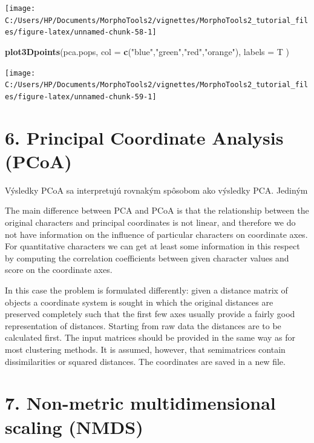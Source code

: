 \documentclass[
]{article}
\newenvironment{Shaded}{\begin{snugshade}}{\end{snugshade}}
\newcommand{\DataTypeTok}[1]{\textcolor[rgb]{0.13,0.29,0.53}{#1}}
\newcommand{\KeywordTok}[1]{\textcolor[rgb]{0.13,0.29,0.53}{\textbf{#1}}}
\newcommand{\NormalTok}[1]{#1}
\newcommand{\StringTok}[1]{\textcolor[rgb]{0.31,0.60,0.02}{#1}}
\begin{document}
\begin{center}\texttt{[image: C:/Users/HP/Documents/MorphoTools2/vignettes/MorphoTools2\_tutorial\_files/figure-latex/unnamed-chunk-58-1]} \end{center}

\begin{Shaded}
\begin{Highlighting}[]
\KeywordTok{plot3Dpoints}\NormalTok{(pca.pops, }\DataTypeTok{col =} \KeywordTok{c}\NormalTok{(}\StringTok{"blue"}\NormalTok{,}\StringTok{"green"}\NormalTok{,}\StringTok{"red"}\NormalTok{,}\StringTok{"orange"}\NormalTok{), }\DataTypeTok{labels =}\NormalTok{ T )}
\end{Highlighting}
\end{Shaded}

\begin{center}\texttt{[image: C:/Users/HP/Documents/MorphoTools2/vignettes/MorphoTools2\_tutorial\_files/figure-latex/unnamed-chunk-59-1]} \end{center}

\hypertarget{principal-coordinate-analysis-pcoa}{%
\section{6. Principal Coordinate Analysis
(PCoA)}\label{principal-coordinate-analysis-pcoa}}

Výsledky PCoA sa interpretujú rovnakým spôsobom ako výsledky PCA.
Jediným

The main difference between PCA and PCoA is that the relationship
between the original characters and principal coordinates is not linear,
and therefore we do not have information on the influence of particular
characters on coordinate axes. For quantitative characters we can get at
least some information in this respect by computing the correlation
coefficients between given character values and score on the coordinate
axes.

In this case the problem is formulated differently: given a distance
matrix of objects a coordinate system is sought in which the original
distances are preserved completely such that the first few axes usually
provide a fairly good representation of distances. Starting from raw
data the distances are to be calculated first. The input matrices should
be provided in the same way as for most clustering methods. It is
assumed, however, that semimatrices contain dissimilarities or squared
distances. The coordinates are saved in a new file.

\hypertarget{non-metric-multidimensional-scaling-nmds}{%
\section{7. Non-metric multidimensional scaling
(NMDS)}\label{non-metric-multidimensional-scaling-nmds}}
\end{document}
